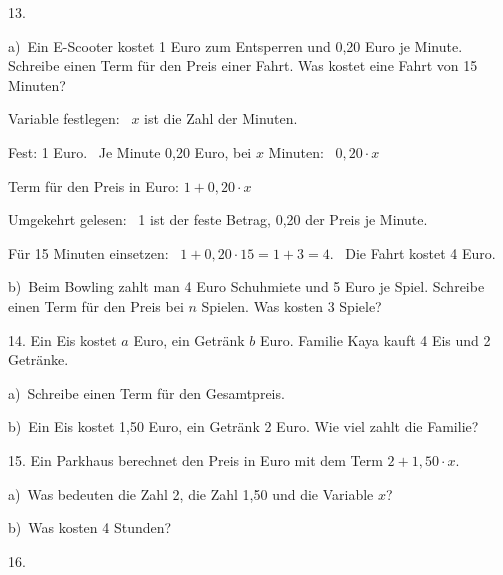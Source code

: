 \documentclass[11pt]{article}
\newcommand{\grau}[1]{{\color{mbgrau}#1}}
\begin{document}
\begin{pfaufg}{}{13.}{}
\grau{a)\ Ein E-Scooter kostet 1 Euro zum Entsperren und 0,20 Euro je Minute. Schreibe einen Term für den Preis einer Fahrt. Was kostet eine Fahrt von 15 Minuten?\par\smallskip Variable festlegen: \ $x$ ist die Zahl der Minuten.\par Fest: 1 Euro. \ Je Minute 0,20 Euro, bei $x$ Minuten: \ $0{,}20 \cdot x$\par Term für den Preis in Euro: \quad $1 + 0{,}20 \cdot x$\par Umgekehrt gelesen: \ 1 ist der feste Betrag, 0,20 der Preis je Minute.\par Für 15 Minuten einsetzen: \ $1 + 0{,}20 \cdot 15 = 1 + 3 = 4$. \ Die Fahrt kostet 4 Euro.}
\par\medskip
b)\ Beim Bowling zahlt man 4 Euro Schuhmiete und 5 Euro je Spiel. Schreibe einen Term für den Preis bei $n$ Spielen. Was kosten 3 Spiele?
\end{pfaufg}

\begin{pfaufg}{}{14.}{}
Ein Eis kostet $a$ Euro, ein Getränk $b$ Euro. Familie Kaya kauft 4 Eis und 2 Getränke. \par a)~Schreibe einen Term für den Gesamtpreis. \par b)~Ein Eis kostet 1,50 Euro, ein Getränk 2 Euro. Wie viel zahlt die Familie?
\end{pfaufg}

\begin{pfaufg}{}{15.}{}
Ein Parkhaus berechnet den Preis in Euro mit dem Term $2 + 1{,}50 \cdot x$. \par a)~Was bedeuten die Zahl 2, die Zahl 1,50 und die Variable $x$? \par b)~Was kosten 4 Stunden?
\end{pfaufg}

\begin{pfaufg}{}{16.}{}
\end{pfaufg}
\end{document}
